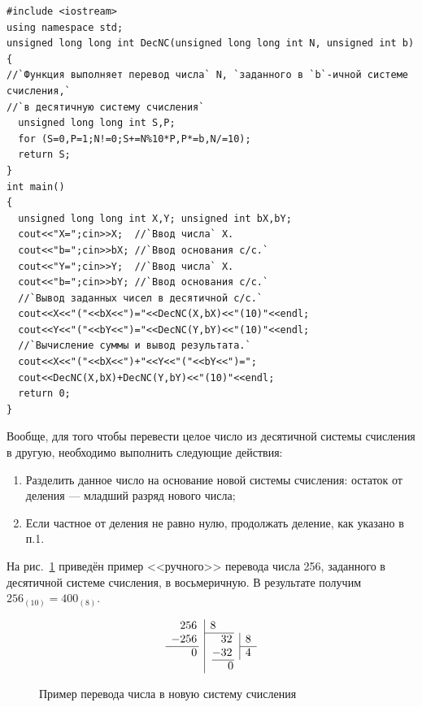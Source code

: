\begin{lstlisting}
#include <iostream>
using namespace std;
unsigned long long int DecNC(unsigned long long int N, unsigned int b)
{
//`Функция выполняет перевод числа` N, `заданного в `b`-ичной системе счисления,` 
//`в десятичную систему счисления`
  unsigned long long int S,P;
  for (S=0,P=1;N!=0;S+=N%10*P,P*=b,N/=10);
  return S;
}
int main()
{
  unsigned long long int X,Y; unsigned int bX,bY;
  cout<<"X=";cin>>X;  //`Ввод числа` X.
  cout<<"b=";cin>>bX; //`Ввод основания с/с.`
  cout<<"Y=";cin>>Y;  //`Ввод числа` X.
  cout<<"b=";cin>>bY; //`Ввод основания с/с.`
  //`Вывод заданных чисел в десятичной с/с.`
  cout<<X<<"("<<bX<<")="<<DecNC(X,bX)<<"(10)"<<endl;
  cout<<Y<<"("<<bY<<")="<<DecNC(Y,bY)<<"(10)"<<endl;
  //`Вычисление суммы и вывод результата.`
  cout<<X<<"("<<bX<<")+"<<Y<<"("<<bY<<")=";
  cout<<DecNC(X,bX)+DecNC(Y,bY)<<"(10)"<<endl;
  return 0;
}
\end{lstlisting}



Вообще, для того чтобы перевести целое число из десятичной системы счисления в другую, необходимо выполнить следующие
действия:

\begin{enumerate}
\item Разделить данное число на основание новой системы счисления: остаток от деления --- младший разряд нового числа;
\item Если частное от деления не равно нулю, продолжать деление, как указано в п.1.
\end{enumerate}
На рис.~\ref{ch04:refDrawing0} 
приведён пример <<ручного>> перевода числа 256, заданного в десятичной системе 
счисления, в восьмеричную. В
результате получим  $256_{(10)}=400_{(8)}$.
\begin{figure}[h]
\begin{minipage}[b]{0.5\textwidth}
$$
\begin{array}{r@{\,}l|l@{\,}l@{\,}l|l}
256 && \multicolumn{4}{l}8\\\cline{3-4}
- 256 &&& \phantom{-}32 &&8\\\cline{1-1}\cline{6-6}
 0 &&& - 32 && 4 \\\cline{4-4}
  && \multicolumn{4}{c}0\\
\end{array}
$$
\caption{Пример перевода числа в новую систему счисления}
\label{ch04:refDrawing0}
\end{minipage}
\end{figure}


